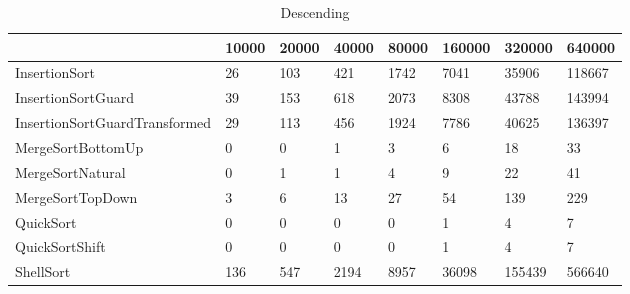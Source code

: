 \begin{table}[h]
\begin{tabular}{|l|l|l|l|l|l|l|l|}
\hline
 & 10000 & 20000 & 40000 & 80000 & 160000 & 320000 & 640000 \\ \hline
InsertionSort & 26 & 103 & 421 & 1742 & 7041 & 35906 & 118667 \\ \hline
InsertionSortGuard & 39 & 153 & 618 & 2073 & 8308 & 43788 & 143994 \\ \hline
InsertionSortGuardTransformed & 29 & 113 & 456 & 1924 & 7786 & 40625 & 136397 \\ \hline
MergeSortBottomUp & 0 & 0 & 1 & 3 & 6 & 18 & 33 \\ \hline
MergeSortNatural & 0 & 1 & 1 & 4 & 9 & 22 & 41 \\ \hline
MergeSortTopDown & 3 & 6 & 13 & 27 & 54 & 139 & 229 \\ \hline
QuickSort & 0 & 0 & 0 & 0 & 1 & 4 & 7 \\ \hline
QuickSortShift & 0 & 0 & 0 & 0 & 1 & 4 & 7 \\ \hline
ShellSort & 136 & 547 & 2194 & 8957 & 36098 & 155439 & 566640 \\ \hline
\end{tabular}
\caption{Descending}
\end{table}
